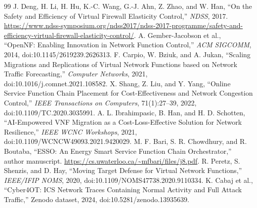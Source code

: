 \documentclass[11pt]{article}
\begin{document}
\begin{thebibliography}{99}
 J. Deng, H. Li, H. Hu, K.-C. Wang, G.-J. Ahn, Z. Zhao, and W. Han, ``On the Safety and Efficiency of Virtual Firewall Elasticity Control,'' \emph{NDSS}, 2017. \url{https://www.ndss-symposium.org/ndss2017/ndss-2017-programme/safety-and-efficiency-virtual-firewall-elasticity-control/}.
 A. Gember-Jacobson et al., ``OpenNF: Enabling Innovation in Network Function Control,'' \emph{ACM SIGCOMM}, 2014, doi:10.1145/2619239.2626313.
 F. Carpio, W. Bziuk, and A. Jukan, ``Scaling Migrations and Replications of Virtual Network Functions based on Network Traffic Forecasting,'' \emph{Computer Networks}, 2021, doi:10.1016/j.comnet.2021.108582.
 X. Shang, Z. Liu, and Y. Yang, ``Online Service Function Chain Placement for Cost-Effectiveness and Network Congestion Control,'' \emph{IEEE Transactions on Computers}, 71(1):27--39, 2022, doi:10.1109/TC.2020.3035991.
 A. L. Ibrahimpasic, B. Han, and H. D. Schotten, ``AI-Empowered VNF Migration as a Cost-Loss-Effective Solution for Network Resilience,'' \emph{IEEE WCNC Workshops}, 2021, doi:10.1109/WCNCW49093.2021.9420029.
 M. F. Bari, S. R. Chowdhury, and R. Boutaba, ``ESSO: An Energy Smart Service Function Chain Orchestrator,'' author manuscript. \url{https://cs.uwaterloo.ca/~mfbari/files/j8.pdf}.
 R. Peretz, S. Shenzis, and D. Hay, ``Moving Target Defense for Virtual Network Functions,'' \emph{IEEE/IFIP NOMS}, 2020, doi:10.1109/NOMS47738.2020.9110334.
 K. Cabaj et al., ``Cyber4OT: ICS Network Traces Containing Normal Activity and Full Attack Traffic,'' Zenodo dataset, 2024, doi:10.5281/zenodo.13935639.
\end{thebibliography}
\end{document}
